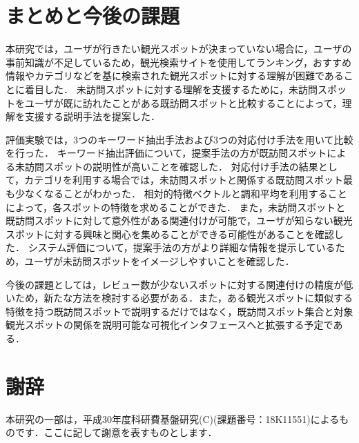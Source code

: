 \documentclass{deimj}
\begin{document}
\section{まとめと今後の課題}
\label{sec:まとめと今後の課題}

本研究では，ユーザが行きたい観光スポットが決まっていない場合に，ユーザの事前知識が不足しているため，観光検索サイトを使用してランキング，おすすめ情報やカテゴリなどを基に検索された観光スポットに対する理解が困難であることに着目した．
未訪問スポットに対する理解を支援するために，未訪問スポットをユーザが既に訪れたことがある既訪問スポットと比較することによって，理解を支援する説明手法を提案した．

評価実験では，3つのキーワード抽出手法および3つの対応付け手法を用いて比較を行った．
キーワード抽出評価について，提案手法の方が既訪問スポットによる未訪問スポットの説明性が高いことを確認した．
対応付け手法の結果として，カテゴリを利用する場合では，未訪問スポットと関係する既訪問スポット最も少なくなることがわかった．
相対的特徴ベクトルと調和平均を利用することによって，各スポットの特徴を求めることができた．
また，未訪問スポットと既訪問スポットに対して意外性がある関連付けが可能で，ユーザが知らない観光スポットに対する興味と関心を集めることができる可能性があることを確認した．
システム評価について，提案手法の方がより詳細な情報を提示しているため，ユーザが未訪問スポットをイメージしやすいことを確認した．

今後の課題としては，レビュー数が少ないスポットに対する関連付けの精度が低いため，新たな方法を検討する必要がある．また，ある観光スポットに類似する特徴を持つ既訪問スポットで説明するだけではなく，既訪問スポット集合と対象観光スポットの関係を説明可能な可視化インタフェースへと拡張する予定である．


\section*{謝辞}
本研究の一部は，平成30年度科研費基盤研究(C)(課題番号：18K11551)によるものです．ここに記して謝意を表すものとします．
\end{document}

